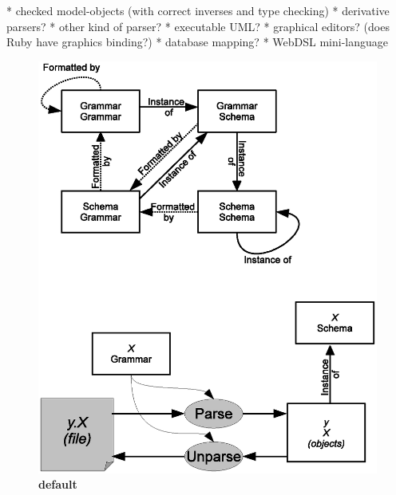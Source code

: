 \documentclass[11pt]{article}
\begin{document}
* checked model-objects (with correct inverses and type checking)
* derivative parsers?
* other kind of parser?
* executable UML?
* graphical editors?
    (does Ruby have graphics binding?)
* database mapping?
* WebDSL mini-language




\begin{figure}[htbp]
\begin{center}
\includegraphics[scale=0.8]{QuadModel.eps}
\caption{{\bf default}}
\label{default}
\end{center}
\end{figure}
\end{document}
